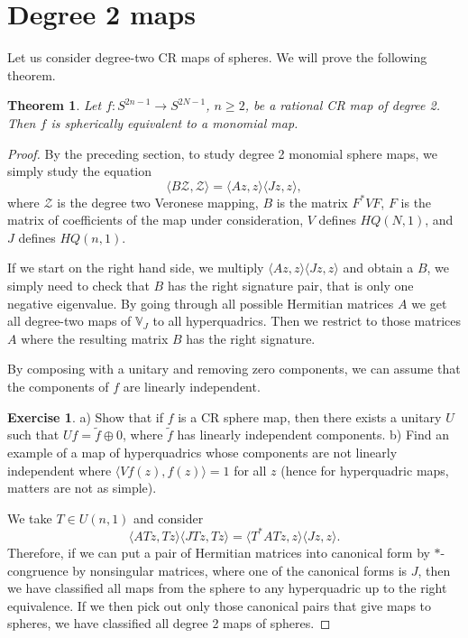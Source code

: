 \documentclass[12pt,openany]{book}
\newcommand{\bV}{{\mathbb{V}}}
\newcommand{\sZ}{{\mathcal{Z}}}
\newcommand{\sectionnewpage}{}
\theoremstyle{plain}
\newtheorem{thm}{Theorem}[section]
\theoremstyle{remark}
\theoremstyle{definition}
\theoremstyle{exercise}
\newtheorem{exercise}{Exercise}[section]
\theoremstyle{example}
\begin{document}
\sectionnewpage
\section{Degree 2 maps}

Let us consider degree-two CR maps of spheres.
We will prove the following theorem.

\begin{thm}
Let $f \colon S^{2n-1} \to S^{2N-1}$, $n \geq 2$, be a rational CR map
of degree 2.  Then $f$ 
is spherically equivalent to a monomial map.
\end{thm}

\begin{proof}
By the preceding section, to study degree 2 monomial sphere maps, we  simply
study the equation
\begin{equation}
\langle B \sZ , \sZ \rangle =
\langle A z , z \rangle
\langle J z , z \rangle ,
\end{equation}
where $\sZ$ is the degree two Veronese mapping, $B$ is the matrix
$F^* V F$, $F$ is the matrix of coefficients of the map under
consideration, $V$ defines $HQ(N,1)$, and $J$ defines $HQ(n,1)$.

If we start on the right hand side, we multiply
$\langle A z , z \rangle \langle J z , z \rangle$
and obtain a $B$, we simply need to check that $B$ has the right signature
pair, that is only one negative eigenvalue.
By going through all possible Hermitian
matrices $A$ we get all degree-two maps of $\bV_J$ to all hyperquadrics.
Then we restrict
to those matrices $A$ where the resulting matrix $B$ has the right signature.

By composing with a unitary and removing zero components,
we can assume that the components of $f$
are linearly independent.

\begin{exercise}
a) Show that if $f$ is a CR sphere map, then there exists a unitary $U$
such that $Uf = \tilde{f} \oplus 0$, where $\tilde{f}$ has linearly
independent components. b) Find an example of a map of hyperquadrics
whose components are not linearly independent where $\langle V f(z), f(z)
\rangle = 1$ for all $z$ (hence for hyperquadric maps, matters are not as
simple).
\end{exercise}

We take $T \in U(n,1)$ and consider
\begin{equation}
\langle A Tz , Tz \rangle \langle J Tz , Tz \rangle
=
\langle T^* A T z , z \rangle \langle J z , z \rangle .
\end{equation}
Therefore, if we can put a pair of Hermitian matrices into canonical form by
$*$-congruence by nonsingular matrices, where one of the canonical forms is
$J$, then we have classified all maps from the sphere
to any hyperquadric up to the right equivalence.
If we then pick out only those canonical pairs that give maps to spheres,
we have classified all degree 2 maps of spheres.


\end{proof}
\end{document}
